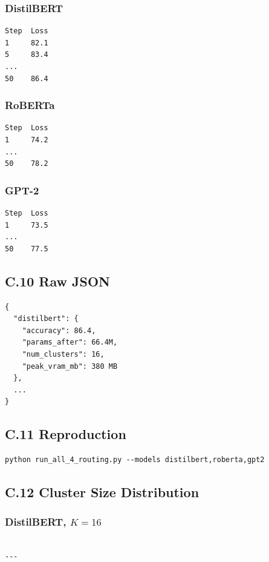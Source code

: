 \subsubsection{DistilBERT}

\begin{lstlisting}
Step  Loss
1     82.1
5     83.4
...
50    86.4
\end{lstlisting}

\subsubsection{RoBERTa}

\begin{lstlisting}
Step  Loss
1     74.2
...
50    78.2
\end{lstlisting}

\subsubsection{GPT-2}

\begin{lstlisting}
Step  Loss
1     73.5
...
50    77.5
\end{lstlisting}

\subsection{C.10 Raw JSON}

\begin{lstlisting}
{
  "distilbert": {
    "accuracy": 86.4,
    "params_after": 66.4M,
    "num_clusters": 16,
    "peak_vram_mb": 380 MB
  },
  ...
}
\end{lstlisting}

\subsection{C.11 Reproduction}

\begin{lstlisting}
python run_all_4_routing.py --models distilbert,roberta,gpt2
\end{lstlisting}

\subsection{C.12 Cluster Size Distribution}

\subsubsection{DistilBERT, $K=16$}

\begin{lstlisting}

---
\end{lstlisting}